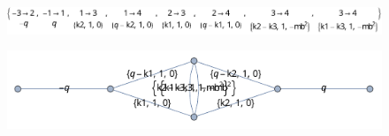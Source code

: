 \documentclass[../FeynCalcManual.tex]{subfiles}
\begin{document}
\begin{Shaded}
\begin{Highlighting}[]
\OperatorTok{[}\OperatorTok{[[}\NormalTok{ ;; }\OperatorTok{]]]}
\end{Highlighting}
\end{Shaded}

\FloatBarrier
\begin{figure}[!ht]
\centering
\includegraphics[width=0.6\linewidth]{img/01p715ugi4jrv.pdf}
\end{figure}
\FloatBarrier

\begin{Shaded}
\begin{Highlighting}[]
\OperatorTok{[}\OperatorTok{[}\OperatorTok{[[}\NormalTok{ ;; }\OperatorTok{]]]]}
\end{Highlighting}
\end{Shaded}

\FloatBarrier
\begin{figure}[!ht]
\centering
\includegraphics[width=0.6\linewidth]{img/0blv15cgm9d0u.pdf}
\end{figure}
\FloatBarrier

\begin{Shaded}
\begin{Highlighting}[]
\OperatorTok{[}\OperatorTok{[\{} \SpecialCharTok{{-}}\OperatorTok{\},}\OperatorTok{,}  \SpecialCharTok{{-}}\OperatorTok{,}\OperatorTok{,} \OperatorTok{\{}\SpecialCharTok{{-}}\OperatorTok{,}\OperatorTok{\},} \OperatorTok{\{}\SpecialCharTok{{-}}\OperatorTok{,}\OperatorTok{\}],} \OperatorTok{\{}\OperatorTok{,}\OperatorTok{,}\OperatorTok{\}]}
\end{Highlighting}
\end{Shaded}
\end{document}
